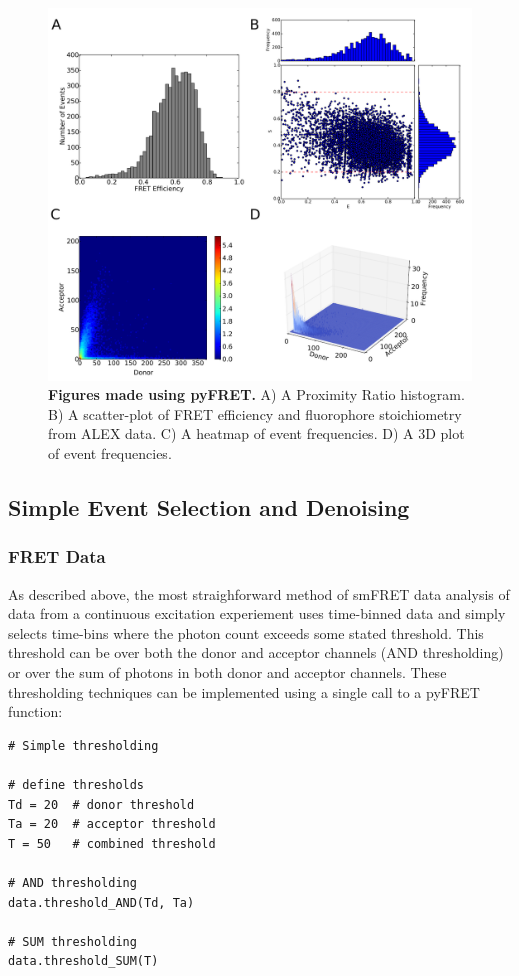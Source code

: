 \begin{figure}[!ht]
   \begin{center}
      \includegraphics*[clip=true, width=6in]{pyFRET/6bp_example.pdf}
      \caption{{\bf Figures made using pyFRET.} A) A Proximity Ratio histogram. B) A scatter-plot of FRET efficiency and fluorophore stoichiometry from ALEX data. C) A heatmap of event frequencies.  D) A 3D plot of event frequencies.}
      \label{fig:fig3_sample_results}
   \end{center}
\end{figure}


\subsection{Simple Event Selection and Denoising}
\subsubsection{FRET Data}
As described above, the most straighforward method of smFRET data analysis of data from a continuous excitation experiement uses time-binned data and simply selects time-bins where the photon count exceeds some stated threshold. This threshold can be over  both the donor and acceptor channels (AND thresholding) or over the sum of photons in both donor and acceptor channels. These thresholding techniques can be implemented using a single call to a pyFRET function: 

\begin{lstlisting}
# Simple thresholding

# define thresholds
Td = 20  # donor threshold
Ta = 20  # acceptor threshold
T = 50   # combined threshold

# AND thresholding
data.threshold_AND(Td, Ta)

# SUM thresholding
data.threshold_SUM(T)
\end{lstlisting}

